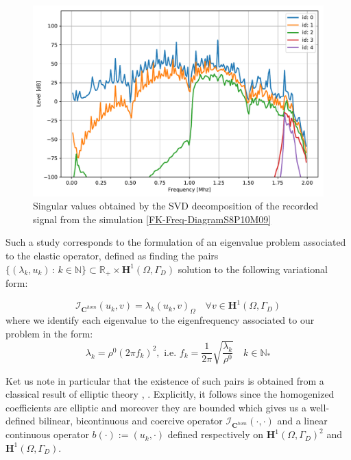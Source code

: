 \begin{figure}[!h]
	\centering
	\includegraphics[scale=.5]{images/FreqRes/2DFreqS810Elastic09_SV.pdf}
	\caption{Singular values obtained by the SVD decomposition of the recorded signal from the simulation \ref{FK-Freq-DiagramS8P10M09}}
	\label{SVD-Freq-S8P10M09}
\end{figure} 

Such a study corresponds to the formulation of an eigenvalue problem associated to the elastic operator, defined as finding the pairs $\{(\lambda_k, u_k) \, : \, k \in \mathbb{N} \} \subset \mathbb{R}_+ \times \mathbf{H}^1(\Omega, \Gamma_D)$ solution to the following variational form:

\begin{equation*}
    \label{VariationalEigenProb}
    \mathcal{I}_{\mathbf{C}^{hom}} (u_k, v) = \lambda_k (u_k, v)_{\Omega} \quad \forall v \in \mathbf{H}^1(\Omega, \Gamma_D)
\end{equation*}
where we identify each eigenvalue to the eigenfrequency associated to our problem in the form:
\begin{equation*}
    \lambda_k = \rho^0 (2\pi f_k)^2, \text{ i.e. } f_k = \frac{1}{2\pi} \sqrt{\frac{\lambda_k}{\rho^0}} \quad k \in \mathbb{N}_{*}
\end{equation*}

\begin{rem}
Ket us note in particular that the existence of such pairs is obtained from a classical result of elliptic theory \cite{raviart1983introduction}, \cite{evans2010partial}. Explicitly, it follows since the homogenized coefficients are elliptic and moreover they are bounded which gives us a well-defined bilinear, bicontinuous and coercive operator $\mathcal{I}_{\mathbf{C}^{hom}}(\cdot, \cdot)$ and a linear continuous operator $b(\cdot) := (u_k, \cdot)$ defined respectively on $\mathbf{H}^1(\Omega, \Gamma_D)^2$ and $\mathbf{H}^1(\Omega, \Gamma_D)$.
\end{rem}



